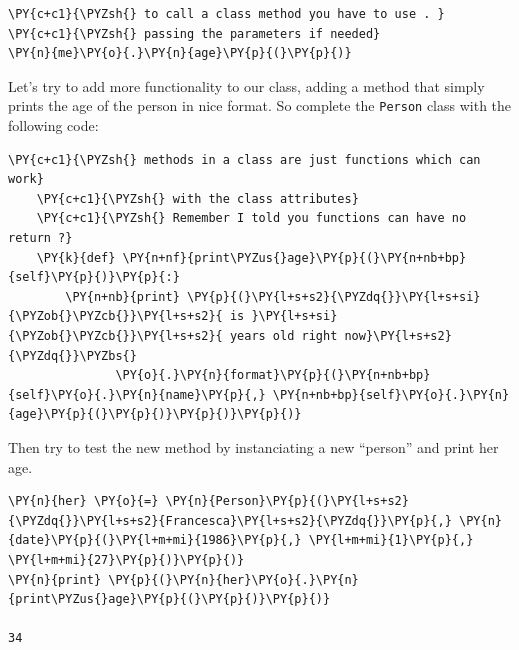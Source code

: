 \begin{Verbatim}[commandchars=\\\{\}]
\PY{c+c1}{\PYZsh{} to call a class method you have to use . }
\PY{c+c1}{\PYZsh{} passing the parameters if needed}
\PY{n}{me}\PY{o}{.}\PY{n}{age}\PY{p}{(}\PY{p}{)}
\end{Verbatim}

Let's try to add more functionality to our class, adding a method that simply prints the age of the person in nice format. So complete the \texttt{Person} class with the following code:

\begin{Verbatim}[commandchars=\\\{\}]
    \PY{c+c1}{\PYZsh{} methods in a class are just functions which can work}
    \PY{c+c1}{\PYZsh{} with the class attributes}
    \PY{c+c1}{\PYZsh{} Remember I told you functions can have no return ?}
    \PY{k}{def} \PY{n+nf}{print\PYZus{}age}\PY{p}{(}\PY{n+nb+bp}{self}\PY{p}{)}\PY{p}{:}
        \PY{n+nb}{print} \PY{p}{(}\PY{l+s+s2}{\PYZdq{}}\PY{l+s+si}{\PYZob{}\PYZcb{}}\PY{l+s+s2}{ is }\PY{l+s+si}{\PYZob{}\PYZcb{}}\PY{l+s+s2}{ years old right now}\PY{l+s+s2}{\PYZdq{}}\PYZbs{}
               \PY{o}{.}\PY{n}{format}\PY{p}{(}\PY{n+nb+bp}{self}\PY{o}{.}\PY{n}{name}\PY{p}{,} \PY{n+nb+bp}{self}\PY{o}{.}\PY{n}{age}\PY{p}{(}\PY{p}{)}\PY{p}{)}\PY{p}{)}
\end{Verbatim}

Then try to test the new method by instanciating a new ``person'' and print her age.

\begin{Verbatim}[commandchars=\\\{\}]
\PY{n}{her} \PY{o}{=} \PY{n}{Person}\PY{p}{(}\PY{l+s+s2}{\PYZdq{}}\PY{l+s+s2}{Francesca}\PY{l+s+s2}{\PYZdq{}}\PY{p}{,} \PY{n}{date}\PY{p}{(}\PY{l+m+mi}{1986}\PY{p}{,} \PY{l+m+mi}{1}\PY{p}{,} \PY{l+m+mi}{27}\PY{p}{)}\PY{p}{)}
\PY{n}{print} \PY{p}{(}\PY{n}{her}\PY{o}{.}\PY{n}{print\PYZus{}age}\PY{p}{(}\PY{p}{)}\PY{p}{)}

34
\end{Verbatim}


